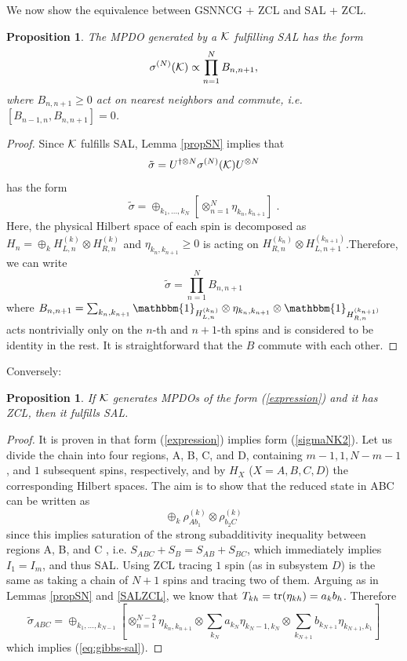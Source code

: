 \documentclass{elsarticle}
\newcommand{\Id}{\mathbbm{1}}
\newcommand{\be}{\begin{equation}}
\newcommand{\ee}{\end{equation}}
\newtheorem{prop}[thm]{Proposition}
\begin{document}
We now show the equivalence between GSNNCG + ZCL and SAL + ZCL. 

\begin{prop}
\label{3to4}
The MPDO generated by a ${\cal K}$ fulfilling SAL has the form
 \be
 \label{expression}
 \sigma^{(N)}({\cal K})\propto \prod_{n=1}^N B_{n,n+1},
 \ee
where $B_{n,n+1}\ge 0$ act on nearest neighbors and commute, i.e. $[B_{n-1,n},B_{n,n+1}]=0$.
\end{prop}

\begin{proof}
Since ${\cal K}$ fulfills SAL, Lemma \ref{propSN} implies that 
 \be
 \tilde \sigma = U^{\dagger\otimes  N} \sigma^{(N)}({\cal K})U^{\otimes  N}
 \ee
 has the form
 \be
 \label{sigmaNK2}
 \tilde \sigma= \oplus_{k_1,\ldots,k_N} \left[\otimes_{n=1}^N \eta_{k_n,k_{n+1}} \right]\;.
\ee
Here, the physical Hilbert space of each spin is decomposed as $H_n=\oplus_{k} H_{L,n}^{(k)}\otimes H_{R,n}^{(k)}$ and $\eta_{k_n,k_{n+1}}\ge 0$ is acting on $H_{R,n}^{(k_n)}\otimes H_{L,n+1}^{(k_{n+1})}$.Therefore, we can write 
 \be
 \tilde\sigma= \prod_{n=1}^N B_{n,n+1}
 \ee
where $B_{n,n+1}=\sum_{k_n, k_{n+1}} \Id_{H_{L,n}^{(k_n)}} \otimes \eta_{k_n,k_{n+1}}\otimes \Id_{H_{R,n}^{(k_{n+1})}}$ acts nontrivially only on the $n$-th and $n+1$-th spins and is considered to be identity in the rest. It is  straightforward that the $B$ commute with each other.
\end{proof}

Conversely:
\begin{prop}
\label{4to2}
If ${\cal K}$ generates MPDOs of the form (\ref{expression}) and it has ZCL,
then it fulfills SAL.
\end{prop}

\begin{proof}
It is proven in \cite{Beigi} that form (\ref{expression}) implies form
 (\ref{sigmaNK2}).
 Let us divide the chain into four regions, A, B, C, and D, containing $m-1,1,N-m-1$, and $1$ subsequent spins, respectively, and by $H_X$ ($X=A,B,C,D$) the corresponding Hilbert spaces. The aim is to show that the reduced state in ABC can be written as 
\be
\label{eq:gibbs-sal}
 \oplus_k \rho_{A b_1}^{(k)} \otimes
 \rho_{b_2 C}^{(k)}
 \ee
since this implies saturation of the strong subadditivity inequality between regions A, B, and C \cite{Hay03}, i.e. $S_{ABC}+S_B=S_{AB}+S_{BC}$, which immediately implies $I_1=I_m$, and thus SAL.
Using ZCL tracing $1$ spin (as in subsystem $D$) is the same as taking a chain of $N+1$ spins and tracing two of them. Arguing as in Lemmas  \ref{propSN} and \ref{SALZCL}, we know that $T_{kh}={\rm tr} (\eta_{kh})=a_kb_h$. 
Therefore
$$
\tilde{\sigma}_{ABC}=\oplus_{k_1,\ldots,k_{N-1}} \left[\otimes_{n=1}^{N-2} \eta_{k_n,k_{n+1}}\otimes \sum_{k_N}a_{k_N} \eta_{k_N-1,k_{N}}\otimes \sum_{k_{N+1}}b_{k_{N+1}} \eta_{k_{N+1},k_{1}} \right]
$$
which implies (\ref{eq:gibbs-sal}).
\end{proof}
\end{document}
